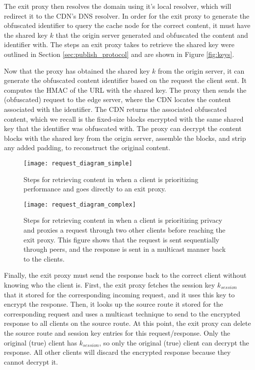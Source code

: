 The exit proxy then resolves the domain using it's local resolver, which will redirect it to the CDN's DNS resolver. In order for the exit proxy to 
generate the obfuscated identifier to query the cache node for the correct content, 
it must have the shared key $k$ that the origin server generated and obfuscated the content and identifier 
with.  The steps an exit proxy takes to retrieve the shared key were outlined in Section \ref{sec:publish_protocol} and are shown in Figure \ref{fig:keys}.

Now that the proxy has obtained the shared key $k$ from the origin server, it can generate the obfuscated content identifier based 
on the request the client sent.  It computes the HMAC of the URL with the shared key.  The proxy then 
sends the (obfuscated) request to the edge server, where the CDN locates the content associated with the identifier.  The CDN returns 
the associated obfuscated content, which we recall is the fixed-size blocks encrypted with the same shared key that the identifier was 
obfuscated with.  The proxy can decrypt the content blocks with the shared key from the origin server, assemble the blocks, and strip any 
added padding, to reconstruct the original content.

\begin{figure}[t!]
\centering
\texttt{[image: request\_diagram\_simple]}
\caption{Steps for retrieving content in \system{} when a client is prioritizing 
performance and goes directly to an exit proxy.}
\label{fig:retrieving}
\end{figure}

\begin{figure}[t!]
\centering
\texttt{[image: request\_diagram\_complex]}
\caption{Steps for retrieving content in \system{} when a client is prioritizing 
privacy and proxies a request through two other clients before reaching the 
exit proxy.  This figure shows that the request is sent sequentially through peers, 
and the response is sent in a multicast manner back to the clients.}
\label{fig:retrieving2}
\end{figure}

Finally, the exit proxy must send the response back to the correct client without
knowing who the client is.  First, the exit proxy fetches the session key $k_{session}$
that it stored for the corresponding incoming request, and it uses this key to encrypt the response.  Then, it looks up the source route it stored for the corresponding request 
and uses a multicast technique to send to the encrypted response to all clients on the source route.  At this point, the exit proxy can delete the source route and session key entries 
for this request/response.  Only the original (true) client has $k_{session}$, so only the original (true) client can decrypt the response.  All other clients will discard 
the encrypted response because they cannot decrypt it.  

